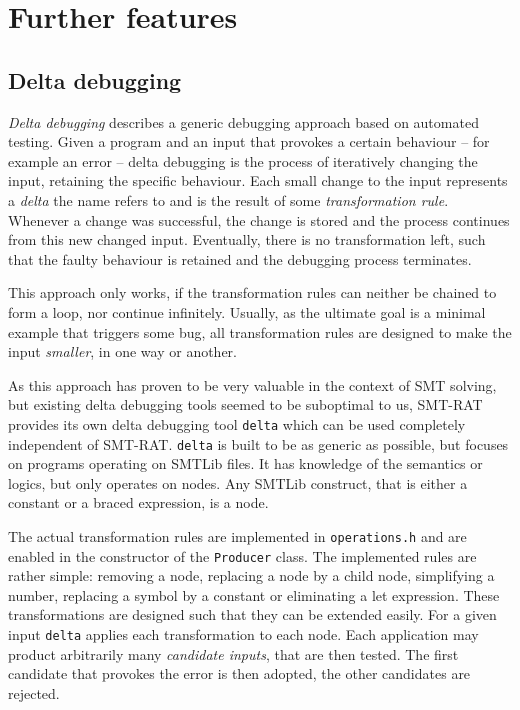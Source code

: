 \chapter{Further features}
\label{chapter:further_features}

\section{Delta debugging}
\emph{Delta debugging} describes a generic debugging approach based on automated testing.
Given a program and an input that provokes a certain behaviour -- for example an error -- delta debugging is the process of iteratively changing the input, retaining the specific behaviour.
Each small change to the input represents a \emph{delta} the name refers to and is the result of some \emph{transformation rule}.
Whenever a change was successful, the change is stored and the process continues from this new changed input.
Eventually, there is no transformation left, such that the faulty behaviour is retained and the debugging process terminates.

This approach only works, if the transformation rules can neither be chained to form a loop, nor continue infinitely.
Usually, as the ultimate goal is a minimal example that triggers some bug, all transformation rules are designed to make the input \emph{smaller}, in one way or another.

As this approach has proven to be very valuable in the context of SMT solving, but existing delta debugging tools\cite{Niemetz2013ddsmt} seemed to be suboptimal to us, SMT-RAT provides its own delta debugging tool \texttt{delta} which can be used completely independent of SMT-RAT.
\texttt{delta} is built to be as generic as possible, but focuses on programs operating on SMTLib files.
It has knowledge of the semantics or logics, but only operates on nodes. Any SMTLib construct, that is either a constant or a braced expression, is a node.

The actual transformation rules are implemented in \texttt{operations.h} and are enabled in the constructor of the \texttt{Producer} class.
The implemented rules are rather simple: removing a node, replacing a node by a child node, simplifying a number, replacing a symbol by a constant or eliminating a let expression.
These transformations are designed such that they can be extended easily.
For a given input \texttt{delta} applies each transformation to each node.
Each application may product arbitrarily many \emph{candidate inputs}, that are then tested. The first candidate that provokes the error is then adopted, the other candidates are rejected.

